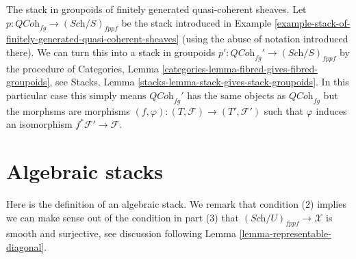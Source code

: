 \begin{example}
\label{example-stack-in-groupoids-of-quasi-coherent-sheaves}
The stack in groupoids of finitely generated quasi-coherent sheaves.
Let $p : \textit{QCoh}_{fg} \to (\textit{Sch}/S)_{fppf}$ be the stack
introduced in
Example \ref{example-stack-of-finitely-generated-quasi-coherent-sheaves}
(using the abuse of notation introduced there).
We can turn this into a stack in groupoids
$p' : \textit{QCoh}_{fg}' \to (\textit{Sch}/S)_{fppf}$ by
the procedure of
Categories, Lemma \ref{categories-lemma-fibred-gives-fibred-groupoids},
see
Stacks, Lemma \ref{stacks-lemma-stack-gives-stack-groupoids}.
In this particular case this simply means $\textit{QCoh}_{fg}'$ has
the same objects as $\textit{QCoh}_{fg}$ but the morphsms are
morphisms $(f, \varphi) : (T, \mathcal{F}) \to (T', \mathcal{F}')$
such that $\varphi$ induces an isomorphism $f^*\mathcal{F}' \to \mathcal{F}$.
\end{example}





















































\section{Algebraic stacks}
\label{section-algebraic-stacks}

\noindent
Here is the definition of an algebraic stack. We remark that condition
(2) implies we can make sense out of the condition in part (3) that
$(\textit{Sch}/U)_{fppf} \to \mathcal{X}$
is smooth and surjective, see discussion following
Lemma \ref{lemma-representable-diagonal}.

